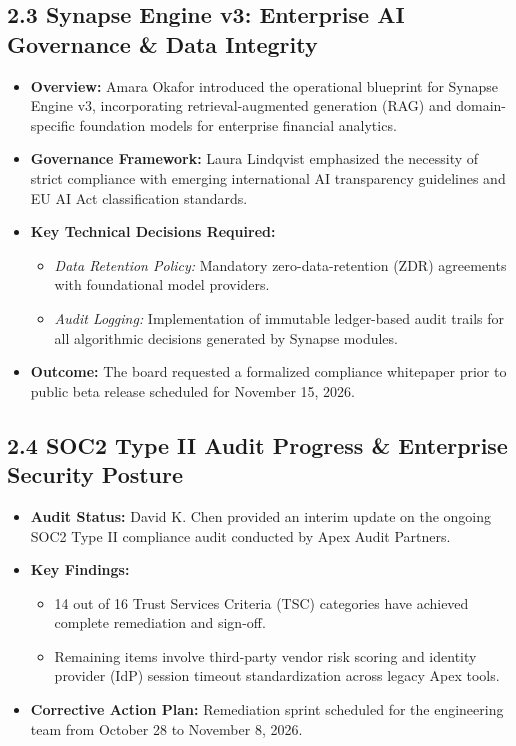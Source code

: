 \documentclass[11pt,a4paper]{article}
\begin{document}
\subsection{2.3 Synapse Engine v3: Enterprise AI Governance \& Data Integrity}
\begin{itemize}[leftmargin=15pt, itemsep=2.5pt]
    \item \textbf{Overview:} Amara Okafor introduced the operational blueprint for Synapse Engine v3, incorporating retrieval-augmented generation (RAG) and domain-specific foundation models for enterprise financial analytics.
    \item \textbf{Governance Framework:}
    Laura Lindqvist emphasized the necessity of strict compliance with emerging international AI transparency guidelines and EU AI Act classification standards.
    \item \textbf{Key Technical Decisions Required:}
    \begin{itemize}[leftmargin=12pt, itemsep=1.5pt]
        \item \textit{Data Retention Policy:} Mandatory zero-data-retention (ZDR) agreements with foundational model providers.
        \item \textit{Audit Logging:} Implementation of immutable ledger-based audit trails for all algorithmic decisions generated by Synapse modules.
    \end{itemize}
    \item \textbf{Outcome:} The board requested a formalized compliance whitepaper prior to public beta release scheduled for November 15, 2026.
\end{itemize}

\subsection{2.4 SOC2 Type II Audit Progress \& Enterprise Security Posture}
\begin{itemize}[leftmargin=15pt, itemsep=2.5pt]
    \item \textbf{Audit Status:} David K. Chen provided an interim update on the ongoing SOC2 Type II compliance audit conducted by Apex Audit Partners.
    \item \textbf{Key Findings:}
    \begin{itemize}[leftmargin=12pt, itemsep=1.5pt]
        \item 14 out of 16 Trust Services Criteria (TSC) categories have achieved complete remediation and sign-off.
        \item Remaining items involve third-party vendor risk scoring and identity provider (IdP) session timeout standardization across legacy Apex tools.
    \end{itemize}
    \item \textbf{Corrective Action Plan:} Remediation sprint scheduled for the engineering team from October 28 to November 8, 2026.
\end{itemize}
\end{document}
